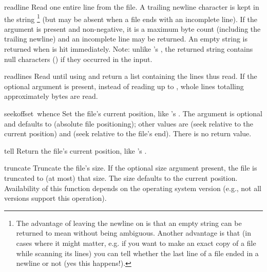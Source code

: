 \begin{funcdesc}{readline}{}
  Read one entire line from the file.  A trailing newline character is
  kept in the string%
\footnote{The advantage of leaving the newline on is that an empty string 
	can be returned to mean \EOF{} without being ambiguous.  Another 
	advantage is that (in cases where it might matter, e.g. if you 
	want to make an exact copy of a file while scanning its lines) 
	you can tell whether the last line of a file ended in a newline
	or not (yes this happens!).}
  (but may be absent when a file ends with an
  incomplete line).  If the  argument is present and
  non-negative, it is a maximum byte count (including the trailing
  newline) and an incomplete line may be returned.
  An empty string is returned when \EOF{} is hit
  immediately.  Note: unlike 's , the returned
  string contains null characters () if they occurred in the
  input.
\end{funcdesc}

\begin{funcdesc}{readlines}{}
  Read until \EOF{} using  and return a list containing
  the lines thus read.  If the optional  argument is
  present, instead of reading up to \EOF{}, whole lines totalling
  approximately  bytes are read.
\end{funcdesc}

\begin{funcdesc}{seek}{offset\, whence}
  Set the file's current position, like 's .
  The  argument is optional and defaults to 
  (absolute file positioning); other values are  (seek
  relative to the current position) and  (seek relative to the
  file's end).  There is no return value.
\end{funcdesc}

\begin{funcdesc}{tell}{}
  Return the file's current position, like 's .
\end{funcdesc}

\begin{funcdesc}{truncate}{}
Truncate the file's size.  If the optional size argument present, the
file is truncated to (at most) that size.  The size defaults to the
current position.  Availability of this function depends on the
operating system version (e.g., not all \UNIX{} versions support this
operation).
\end{funcdesc}

